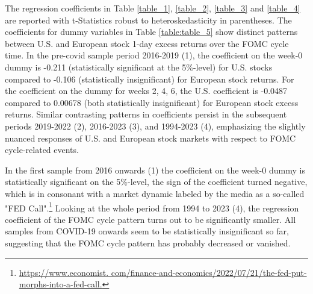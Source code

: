 The regression coefficients in Table \ref{table_1},  \ref{table_2},  \ref{table_3} and \ref{table_4} are reported with t-Statistics robust to heteroskedasticity in parentheses.
The coefficients for dummy variables in Table \ref{table:table_5} show distinct patterns between U.S. and European stock 1-day excess returns over the FOMC cycle time.
In the pre-covid sample period 2016-2019 (1), the coefficient on the week-0 dummy is -0.211 (statistically significant at the 5\%-level) for U.S. stocks compared to -0.106 (statistically insignificant) for European stock returns.
For the coefficient on the dummy for weeks 2, 4, 6, the U.S.  coefficient is -0.0487 compared to 0.00678 (both statistically insignificant) for European stock excess returns.  Similar contrasting patterns in coefficients persist in the subsequent periods 2019-2022 (2), 2016-2023 (3), and 1994-2023 (4), emphasizing the slightly nuanced responses of U.S.  and European stock markets with respect to FOMC cycle-related events.


In the first sample from 2016 onwards (1) the coefficient on the week-0 dummy is statistically significant on the 5\%-level, the sign of the coefficient turned negative, which is in consonant with a market dynamic labeled by the media as a so-called "FED Call".\footnote{\url{https://www.economist. com/finance-and-economics/2022/07/21/the-fed-put-morphs-into-a-fed-call.}} Looking at the whole period from 1994 to 2023 (4), the regression coefficient of the FOMC cycle pattern turns out to be significantly smaller.  All samples from COVID-19 onwards seem to be statistically insignificant so far, suggesting that the FOMC cycle pattern has probably decreased or vanished.




